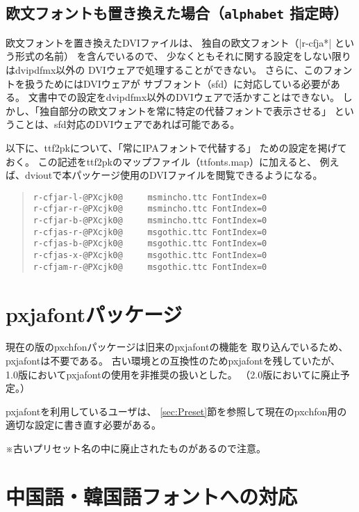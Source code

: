 \documentclass[uplatex,dvipdfmx,a4paper]{jsarticle}
\newcommand{\Pkg}[1]{\textsf{#1}}
\newcommand{\Note}{\par\noindent ※}
\begin{document}
\subsection{欧文フォントも置き換えた場合（\texttt{alphabet} 指定時）}

欧文フォントを置き換えたDVIファイルは、
独自の欧文フォント（|r-cfja*| という形式の名前）
を含んでいるので、
少なくともそれに関する設定をしない限りはdvipdfmx以外の
DVIウェアで処理することができない。
さらに、このフォントを扱うためにはDVIウェアが
サブフォント（sfd）に対応している必要がある。
文書中での設定をdvipdfmx以外のDVIウェアで活かすことはできない。
しかし、「独自部分の欧文フォントを常に特定の代替フォントで表示させる」
ということは、sfd対応のDVIウェアであれば可能である。

以下に、ttf2pkについて、「常にIPAフォントで代替する」
ための設定を掲げておく。
この記述をttf2pkのマップファイル（ttfonts.map）に加えると、
例えば、dvioutで本パッケージ使用のDVIファイルを閲覧できるようになる。

\begin{quote}\small\begin{verbatim}
r-cfjar-l-@PXcjk0@     msmincho.ttc FontIndex=0
r-cfjar-r-@PXcjk0@     msmincho.ttc FontIndex=0
r-cfjar-b-@PXcjk0@     msmincho.ttc FontIndex=0
r-cfjas-r-@PXcjk0@     msgothic.ttc FontIndex=0
r-cfjas-b-@PXcjk0@     msgothic.ttc FontIndex=0
r-cfjas-x-@PXcjk0@     msgothic.ttc FontIndex=0
r-cfjam-r-@PXcjk0@     msgothic.ttc FontIndex=0
\end{verbatim}\end{quote}

\section{pxjafontパッケージ}

現在の版の\Pkg{pxchfon}パッケージは旧来の\Pkg{pxjafont}の機能を
取り込んでいるため、\Pkg{pxjafont}は不要である。
古い環境との互換性のため\Pkg{pxjafont}を残していたが、
1.0版において\Pkg{pxjafont}の使用を非推奨の扱いとした。
（2.0版においてに廃止予定。）

\Pkg{pxjafont}を利用しているユーザは、
\ref{sec:Preset}節を参照して現在の\Pkg{pxchfon}用の
適切な設定に書き直す必要がある。

\Note 古いプリセット名の中に廃止されたものがあるので注意。

\section{中国語・韓国語フォントへの対応}
\label{sec:Non-Japanese}
\end{document}
